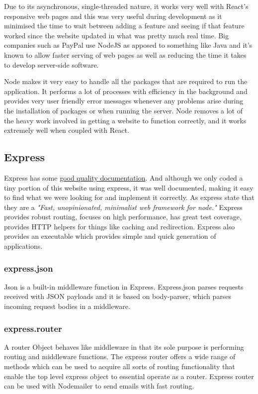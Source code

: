 Due to its asynchronous, single-threaded nature, it works very well with React's responsive web pages and this was very useful during development as it minimised the time to wait between adding a feature and seeing if that feature worked since the website updated in what was pretty much real time. Big companies such as PayPal use NodeJS as apposed to something like Java and it's known to allow faster serving of web pages as well as reducing the time it takes to develop server-side software.\cite{PaypalNodeJS}\par
Node makes it very easy to handle all the packages that are required to run the application. It performs a lot of processes with efficiency in the background and provides very user friendly error messages whenever any problems arise during the installation of packages or when running the server. Node removes a lot of the heavy work involved in getting a website to function correctly, and it works extremely well when coupled with React.

\subsection{Express}
Express has some \href{https://expressjs.com/en/5x/api.html}{good quality documentation}. And although we only coded a tiny portion of this website using express, it was well documented, making it easy to find what we were looking for and implement it correctly. As express state that they are a \emph{"Fast, unopinionated, minimalist web framework for node."} Express provides robust routing, focuses on high performance, has great test coverage, provides HTTP helpers for things like caching and redirection.\cite{ExpressRM} Express also provides an executable which provides simple and quick generation of applications. 

\subsubsection{express.json} 
Json is a built-in middleware function in Express. Express.json parses requests received with JSON payloads and it is based on body-parser, which parses incoming request bodies in a middleware. 

\subsubsection{express.router}
A router Object behaves like middleware in that its sole purpose is performing routing and middleware functions. The express router offers a wide range of methods which can be used to acquire all sorts of routing functionality that enable the top level express object to essential operate as a router. Express router can be used with Nodemailer to send emails with fast routing.

